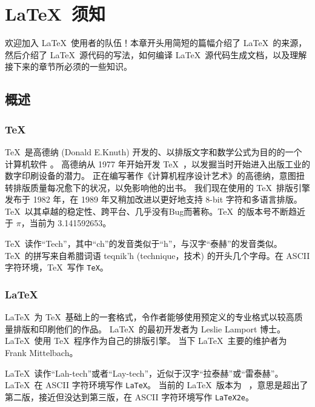 \chapter{\LaTeX\ 须知}\label{chap:basics}

\begin{intro}
欢迎加入 \LaTeX\ 使用者的队伍！本章开头用简短的篇幅介绍了 \LaTeX\ 的来源，
然后介绍了 \LaTeX\ 源代码的写法，如何编译 \LaTeX\ 源代码生成文档，以及理解接下来的章节所必须的一些知识。
\end{intro}

\section{概述}\label{sec:intro}

\subsection{\protect\TeX}\label{subsec:tex}

\TeX\ 是高德纳 (Donald E.Knuth) 开发的、以排版文字和数学公式为目的的一个计算机软件 \cite{texbook}。
高德纳从 1977 年开始开发 \TeX\ ，以发掘当时开始进入出版工业的数字印刷设备的潜力。
正在编写著作《计算机程序设计艺术》的高德纳，意图扭转排版质量每况愈下的状况，以免影响他的出书。
我们现在使用的 \TeX\ 排版引擎发布于 1982 年，在 1989 年又稍加改进以更好地支持 8-bit 字符和多语言排版。
\TeX\ 以其卓越的稳定性、跨平台、几乎没有Bug而著称。\TeX\ 的版本号不断趋近于 $\pi$，当前为 3.141592653。

\TeX\ 读作``Tech''，其中``ch''的发音类似于``h''，与汉字“泰赫”的发音类似。\TeX\ 的拼写来自希腊词语
{\selectfont teqnik'h} (technique，技术) 的开头几个字母。在 ASCII 字符环境，\TeX\ 写作 \texttt{TeX}。

\subsection{\LaTeX}\label{subsec:latex}

\LaTeX\ 为 \TeX\ 基础上的一套格式，令作者能够使用预定义的专业格式以较高质量排版和印刷他们的作品。
\LaTeX\ 的最初开发者为 Leslie Lamport 博士\cite{manual}。\LaTeX\ 使用 \TeX\ 程序作为自己的排版引擎。
当下 \LaTeX\ 主要的维护者为 Frank Mittelbach。

\LaTeX\ 读作``Lah-tech''或者``Lay-tech''，近似于汉字“拉泰赫”或“雷泰赫”。\LaTeX\ 在 ASCII 字符环境写作 \texttt{LaTeX}。
当前的 \LaTeX\ 版本为 \LaTeXe\ ，意思是超出了第二版，接近但没达到第三版，在 ASCII 字符环境写作 \texttt{LaTeX2e}。


